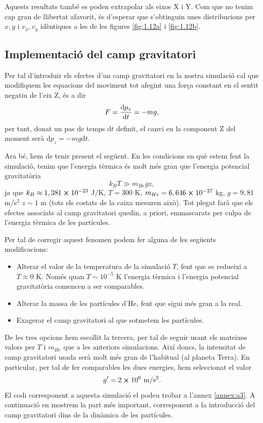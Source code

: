 \documentclass[a4paper,10.5pt]{report}
\begin{document}
Aquests resultats també es poden extrapolar als eixos X i Y. Com que no tenim cap grau de llibertat afavorit, és d'esperar que s'obtinguin unes distribucions per $x, y$ i $v_x, v_y$ idèntiques a les de les figures \ref{fig:1.12a} i \ref{fig:1.12b}.

\subsection{Implementació del camp gravitatori}
Per tal d'introduir els efectes d'un camp gravitatori en la nostra simulació cal que modifiquem les equacions del moviment tot afegint una força constant en el sentit negatiu de l'eix Z, és a dir
\begin{equation}
	F = \derivative{p_z}{t} = -m g,
\end{equation}
per tant, donat un pas de temps $\mathrm{d}t$ definit, el canvi en la component Z del moment serà $\mathrm{d}p_z = -mg\mathrm{d}t$.

Ara bé, hem de tenir present el següent. En les condicions en què estem fent la simulació, tenim que l'energia tèrmica és molt més gran que l'energia potencial gravitatòria
\begin{equation}
	k_BT \gg m_{He}gz,
\end{equation}
ja que $k_B \approx 1,381\cross 10^{-23}$ J/K, $T = 300$ K, $m_{He} = 6,646\cross 10^{-27}$ kg, $g = 9,81$ m/s$^2$ $z \sim 1$ m (tots els costats de la caixa mesuren això). Tot plegat farà que els efectes associats al camp gravitatori quedin, a priori, emmascarats per culpa de l'energia tèrmica de les partícules. 

Per tal de corregir aquest fenomen podem fer alguna de les següents modificacions:
\begin{itemize}
	\item Alterar el valor de la temperatura de la simulació $T$, fent que es redueixi a $T \approx 0$ K. Només quan $T \sim 10^{-5}$ K l'energia tèrmica i l'energia potencial gravitatòria comencen a ser comparables.
	\item Alterar la massa de les partícules d'He, fent que sigui més gran a la real.
	\item Exagerar el camp gravitatori al que sotmetem les partícules.
\end{itemize}
De les tres opcions hem escollit la tercera, per tal de seguir usant els mateixos valors per $T$ i $m_{He}$ que a les anteriors simulacions. Així doncs, la intensitat de camp gravitatori usada serà molt més gran de l'habitual (al planeta Terra). En particular, per tal de fer comparables les dues energies, hem seleccionat el valor
\begin{equation*}
	g' = 2\cross 10^6 \text{ m/s$^2$}.
\end{equation*}
El codi corresponent a aquesta simulació el podeu trobar a l'annex \ref{annex:a3}. A continuació en mostrem la part més important, corresponent a la introducció del camp gravitatori dins de la dinàmica de les partícules. 
\end{document}
